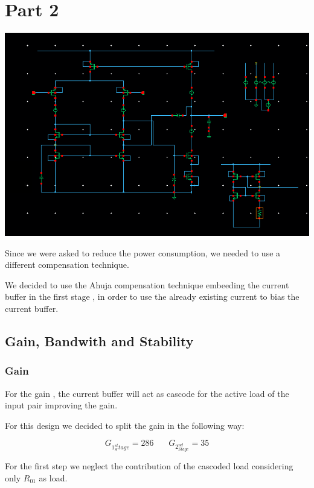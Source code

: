 \chapter{Part 2} %
\label{cha:part_2}


\centering
\includegraphics[width=1\textwidth]{Capitoli/whole2.png}
\raggedright



Since we were asked to reduce the power consumption, we needed to use a different compensation technique.

We decided to use the Ahuja compensation technique embeeding the current buffer in the first stage , in order to use the already existing current to bias the current buffer.

\section{Gain, Bandwith and Stability}

\subsection{Gain} %
\label{sec:gain}

For the gain , the current buffer will act as cascode for the active load of the input pair improving the gain.

For this design we decided to split the gain in the following way:

\begin{equation}
	G_{1^{st}_Stage}=286 \ \ \ \ \ \ \ \ 
	G_{2^{nd}_{Stage}}=35
\end{equation}


For the first step we neglect the contribution of the cascoded load considering only $R_{01}$ as load.

